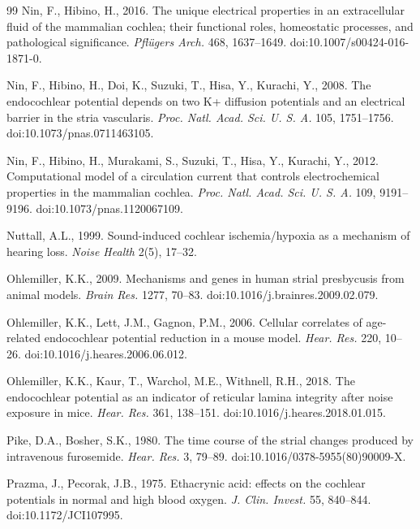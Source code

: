 \documentclass[final,5p,times]{elsarticle}
\begin{document}
\begin{thebibliography}{99}
Nin, F., Hibino, H., 2016. The unique electrical properties in an extracellular fluid of the mammalian cochlea; their functional roles, homeostatic processes, and pathological significance. \emph{Pflügers Arch.} 468, 1637--1649. doi:10.1007/s00424-016-1871-0.

Nin, F., Hibino, H., Doi, K., Suzuki, T., Hisa, Y., Kurachi, Y., 2008. The endocochlear potential depends on two K+ diffusion potentials and an electrical barrier in the stria vascularis. \emph{Proc. Natl. Acad. Sci. U. S. A.} 105, 1751--1756. doi:10.1073/pnas.0711463105.

Nin, F., Hibino, H., Murakami, S., Suzuki, T., Hisa, Y., Kurachi, Y., 2012. Computational model of a circulation current that controls electrochemical properties in the mammalian cochlea. \emph{Proc. Natl. Acad. Sci. U. S. A.} 109, 9191--9196. doi:10.1073/pnas.1120067109.

Nuttall, A.L., 1999. Sound-induced cochlear ischemia/hypoxia as a mechanism of hearing loss. \emph{Noise Health} 2(5), 17--32.

Ohlemiller, K.K., 2009. Mechanisms and genes in human strial presbycusis from animal models. \emph{Brain Res.} 1277, 70--83. doi:10.1016/j.brainres.2009.02.079.

Ohlemiller, K.K., Lett, J.M., Gagnon, P.M., 2006. Cellular correlates of age-related endocochlear potential reduction in a mouse model. \emph{Hear. Res.} 220, 10--26. doi:10.1016/j.heares.2006.06.012.

Ohlemiller, K.K., Kaur, T., Warchol, M.E., Withnell, R.H., 2018. The endocochlear potential as an indicator of reticular lamina integrity after noise exposure in mice. \emph{Hear. Res.} 361, 138--151. doi:10.1016/j.heares.2018.01.015.

Pike, D.A., Bosher, S.K., 1980. The time course of the strial changes produced by intravenous furosemide. \emph{Hear. Res.} 3, 79--89. doi:10.1016/0378-5955(80)90009-X.

Prazma, J., Pecorak, J.B., 1975. Ethacrynic acid: effects on the cochlear potentials in normal and high blood oxygen. \emph{J. Clin. Invest.} 55, 840--844. doi:10.1172/JCI107995.


\end{thebibliography}
\end{document}
